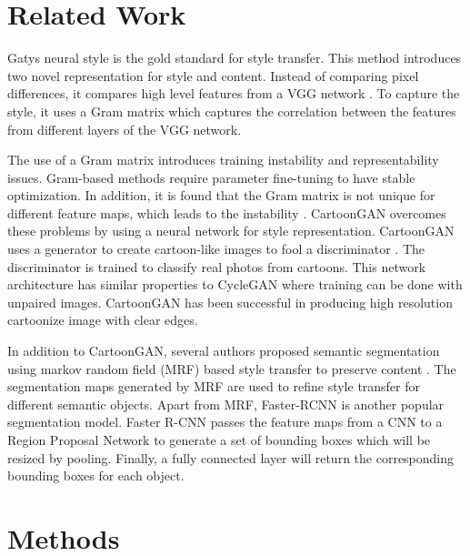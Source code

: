 \documentclass{article}
\begin{document}
\section{Related Work}

Gatys neural style \cite{Gatys} is the gold standard for style transfer. This method introduces two novel representation for style and content. Instead of comparing pixel differences, it compares high level features from a VGG network \cite{VGG}. To capture the style, it uses a Gram matrix which captures the correlation between the features from different layers of the VGG network.

The use of a Gram matrix introduces training instability and representability issues. Gram-based methods require parameter fine-tuning to have stable optimization. In addition, it is found that the Gram matrix is not unique for different feature maps, which leads to the instability \cite{NeuralReview}. CartoonGAN overcomes these problems by using a neural network for style representation. CartoonGAN uses a generator to create cartoon-like images to fool a discriminator \cite{CartoonGAN}. The discriminator is trained to classify real photos from cartoons. This network architecture has similar properties to CycleGAN \cite{CycleGAN} where training can be done with unpaired images. CartoonGAN has been successful in producing high resolution cartoonize image with clear edges.

In addition to CartoonGAN, several authors proposed semantic segmentation using markov random field (MRF) based style transfer to preserve content \cite{segment1, segment2}. The segmentation maps generated by MRF are used to refine style transfer for different semantic objects. Apart from MRF, Faster-RCNN \cite{FRCNN} is another popular segmentation model. Faster R-CNN passes the feature maps from a CNN to a Region Proposal Network to generate a set of bounding boxes which will be resized by pooling. Finally, a fully connected layer will return the corresponding bounding boxes for each object.

\section{Methods}
\end{document}
